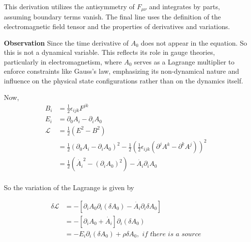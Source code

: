 \documentclass{article}
\begin{document}
This derivation utilizes the antisymmetry of \(F_{\mu\nu}\) and integrates by parts, assuming boundary terms vanish. The final line uses the definition of the electromagnetic field tensor and the properties of derivatives and variations.

\textbf{Observation}
Since the time derivative of \( A_0 \) does not appear in the equation. So this is not a dynamical variable. This reflects its role in gauge theories, particularly in electromagnetism, where \( A_0 \) serves as a Lagrange multiplier to enforce constraints like Gauss's law, emphasizing its non-dynamical nature and influence on the physical state configurations rather than on the dynamics itself. 

Now, 
\begin{align*}
    B_i &= \frac{1}{2} \epsilon_{ijk} F^{jk} \\
    E_i &= \partial_0 A_i - \partial_i A_0 \\
    \mathcal{L} &= \frac{1}{2} \left( E^2 - B^2 \right) \\
    &= \frac{1}{2} \left( \partial_0 A_i - \partial_i A_0 \right)^2 - \frac{1}{2} \left( \frac{1}{2} \epsilon_{ijk} (\partial^j A^k - \partial^k A^j) \right)^2 \\ 
    &= \frac{1}{2} ( \dot{A_i}^2 - (\partial_i A_0)^2 ) - \dot{A_i} \partial_i A_0    \\
\end{align*} 

So the variation of the Lagrange is given by 

\begin{align*}
    \delta \mathcal{L} &= - [ \partial_i A_0 \partial_i(\delta A_0) - \dot{A_i}\partial_i \delta A_0  ]  \\
           &= - [ \partial_i A_0 + \dot{A_i} ] \partial_i (\delta A_0)  \\
           &= - E_i \partial_i (\delta A_0) + \rho \delta A_0 , \textit{  if there is a source} \\
\end{align*}
\end{document}
